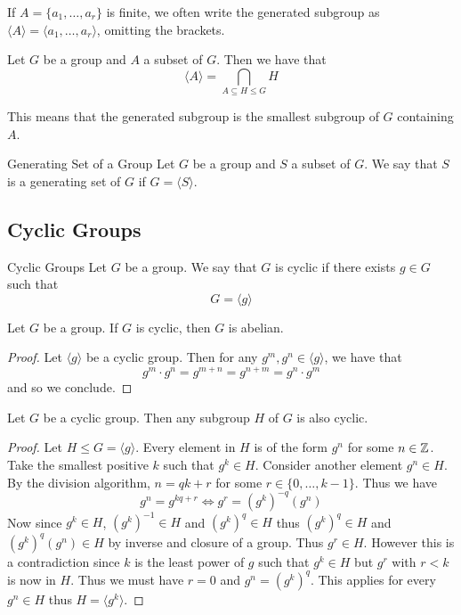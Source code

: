 \documentclass[a4paper]{article}
\begin{document}
If $A=\{a_1,\dots,a_r\}$ is finite, we often write the generated subgroup as $\langle A\rangle=\langle a_1,\dots,a_r\rangle$, omitting the brackets. \\

\begin{prp}{}{} Let $G$ be a group and $A$ a subset of $G$. Then we have that $$\langle A\rangle=\bigcap_{A\subseteq H\leq G}H$$
\end{prp}

This means that the generated subgroup is the smallest subgroup of $G$ containing $A$. 

\begin{defn}{Generating Set of a Group}{} Let $G$ be a group and $S$ a subset of $G$. We say that $S$ is a generating set of $G$ if $G=\langle S\rangle$. 
\end{defn}

\subsection{Cyclic Groups}
\begin{defn}{Cyclic Groups}{} Let $G$ be a group. We say that $G$ is cyclic if there exists $g\in G$ such that $$G=\langle g\rangle$$
\end{defn}

\begin{lmm}{}{} Let $G$ be a group. If $G$ is cyclic, then $G$ is abelian. 
\begin{proof}
Let $\langle g\rangle$ be a cyclic group. Then for any $g^m,g^n\in\langle g\rangle$, we have that $$g^m\cdot g^n=g^{m+n}=g^{n+m}=g^n\cdot g^m$$ and so we conclude. 
\end{proof}
\end{lmm}

\begin{prp}{}{} Let $G$ be a cyclic group. Then any subgroup $H$ of $G$ is also cyclic. 
\begin{proof} Let $H\leq G=\langle g\rangle$. Every element in $H$ is of the form $g^n$ for some $n\in\mathbb{Z}$. Take the smallest positive $k$ such that $g^k\in H$. Consider another element $g^n\in H$. By the division algorithm, $n=qk+r$ for some $r\in\{0,\dots,k-1\}$. Thus we have $$g^n=g^{kq+r}\iff g^r=(g^k)^{-q}(g^n)$$ Now since $g^k\in H$, $(g^k)^{-1}\in H$ and $(g^k)^q\in H$ thus $(g^k)^q\in H$ and $(g^k)^q(g^n)\in H$ by inverse and closure of a group. Thus $g^r\in H$. However this is a contradiction since $k$ is the least power of $g$ such that $g^k\in H$ but $g^r$ with $r<k$ is now in $H$. Thus we must have $r=0$ and $g^n=(g^k)^q$. This applies for every $g^n\in H$ thus $H=\langle g^k\rangle$. 
\end{proof}
\end{prp}
\end{document}
